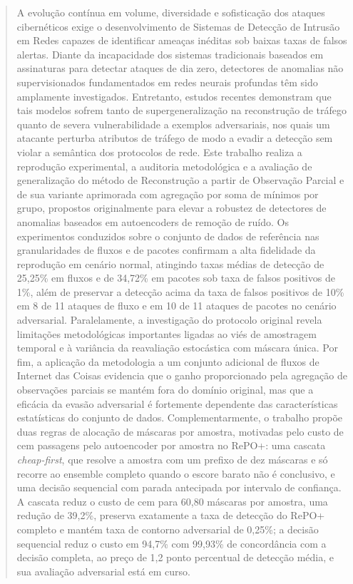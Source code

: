 \documentclass[conference]{IEEEtran}
\begin{document}
\begin{abstract}
A evolução contínua em volume, diversidade e sofisticação dos ataques cibernéticos exige o desenvolvimento de Sistemas de Detecção de Intrusão em Redes capazes de identificar ameaças inéditas sob baixas taxas de falsos alertas.
Diante da incapacidade dos sistemas tradicionais baseados em assinaturas para detectar ataques de dia zero, detectores de anomalias não supervisionados fundamentados em redes neurais profundas têm sido amplamente investigados.
Entretanto, estudos recentes demonstram que tais modelos sofrem tanto de supergeneralização na reconstrução de tráfego quanto de severa vulnerabilidade a exemplos adversariais, nos quais um atacante perturba atributos de tráfego de modo a evadir a detecção sem violar a semântica dos protocolos de rede.
Este trabalho realiza a reprodução experimental, a auditoria metodológica e a avaliação de generalização do método de Reconstrução a partir de Observação Parcial e de sua variante aprimorada com agregação por soma de mínimos por grupo, propostos originalmente para elevar a robustez de detectores de anomalias baseados em autoencoders de remoção de ruído.
Os experimentos conduzidos sobre o conjunto de dados de referência nas granularidades de fluxos e de pacotes confirmam a alta fidelidade da reprodução em cenário normal, atingindo taxas médias de detecção de 25,25\% em fluxos e de 34,72\% em pacotes sob taxa de falsos positivos de 1\%, além de preservar a detecção acima da taxa de falsos positivos de 10\% em 8 de 11 ataques de fluxo e em 10 de 11 ataques de pacotes no cenário adversarial.
Paralelamente, a investigação do protocolo original revela limitações metodológicas importantes ligadas ao viés de amostragem temporal e à variância da reavaliação estocástica com máscara única.
Por fim, a aplicação da metodologia a um conjunto adicional de fluxos de Internet das Coisas evidencia que o ganho proporcionado pela agregação de observações parciais se mantém fora do domínio original, mas que a eficácia da evasão adversarial é fortemente dependente das características estatísticas do conjunto de dados.
Complementarmente, o trabalho propõe duas regras de alocação de máscaras por amostra, motivadas pelo custo de cem passagens pelo autoencoder por amostra no RePO+: uma cascata \textit{cheap-first}, que resolve a amostra com um prefixo de dez máscaras e só recorre ao ensemble completo quando o escore barato não é conclusivo, e uma decisão sequencial com parada antecipada por intervalo de confiança.
A cascata reduz o custo de cem para 60,80 máscaras por amostra, uma redução de 39,2\%, preserva exatamente a taxa de detecção do RePO+ completo e mantém taxa de contorno adversarial de 0,25\%; a decisão sequencial reduz o custo em 94,7\% com 99,93\% de concordância com a decisão completa, ao preço de 1,2 ponto percentual de detecção média, e sua avaliação adversarial está em curso.
\end{abstract}
\end{document}

